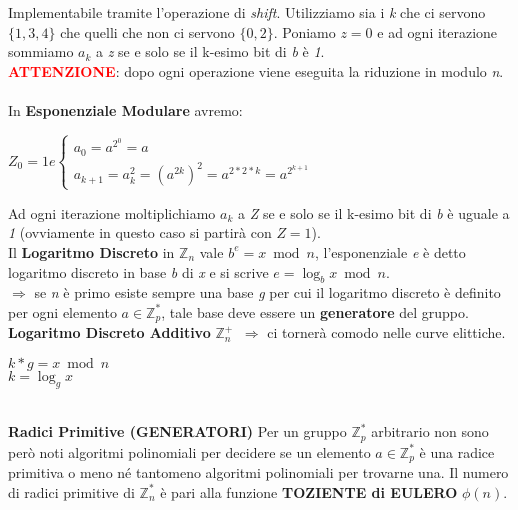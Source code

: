 Implementabile tramite l'operazione di \textit{shift}. Utilizziamo sia i \textit{k} che ci servono $\{1, 3, 4\}$ che quelli che non ci servono $\{0, 2\}$. Poniamo $z = 0$ e ad ogni iterazione sommiamo $a_k$ a \textit{z} se e solo se il k-esimo bit di \textit{b} è \textit{1}. \\
\textcolor{red}{\textbf{ATTENZIONE}}: dopo ogni operazione viene eseguita la riduzione in modulo \textit{n}.
\\ \\ \newline
In \textbf{Esponenziale Modulare} avremo:
\begin{center}
    \begin{math}
        Z_0 = 1 e 
        \begin{cases}
            a_0 = a^{2^0} = a \\
            a_{k+1} = a_k^2 = (a^{2k})^2 = a^{2*2*k} = a^{2^{k+1}}
        \end{cases}
    \end{math}
\end{center}
Ad ogni iterazione moltiplichiamo $a_k$ a \textit{Z} se e solo se il k-esimo bit di \textit{b} è uguale a \textit{1} (ovviamente in questo caso si partirà con $Z = 1$).
\\ \newline
Il \textbf{Logaritmo Discreto} in $\mathbb{Z}_n$ vale $b^e = x \bmod n$, l'esponenziale \textit{e} è detto logaritmo discreto in base \textit{b} di \textit{x} e si scrive $e = \log_{b}{x} \bmod n$. \\
$\Rightarrow$ se \textit{n} è primo esiste sempre una base \textit{g} per cui il logaritmo discreto è definito per ogni elemento $a \in \mathbb{Z}_p^*$, tale base deve essere un \textbf{generatore} del gruppo.
\\ \newline
\textbf{Logaritmo Discreto Additivo} $\mathbb{Z}_n^+ \;\; \Rightarrow$ ci tornerà comodo nelle curve elittiche.
\begin{center}
    $k * g = x \bmod n$ \\
    $k = \log_{g}{x}$ \\
\end{center}
\   \\
\textbf{Radici Primitive (GENERATORI)}
\newline
Per un gruppo $\mathbb{Z}_p^*$ arbitrario non sono però noti algoritmi polinomiali per decidere se un elemento $a \in \mathbb{Z}_p^*$ è una radice primitiva o meno né tantomeno algoritmi polinomiali per trovarne una. Il numero di radici primitive di $\mathbb{Z}_n^*$ è pari alla funzione \textbf{TOZIENTE di EULERO} $\phi(n)$.
